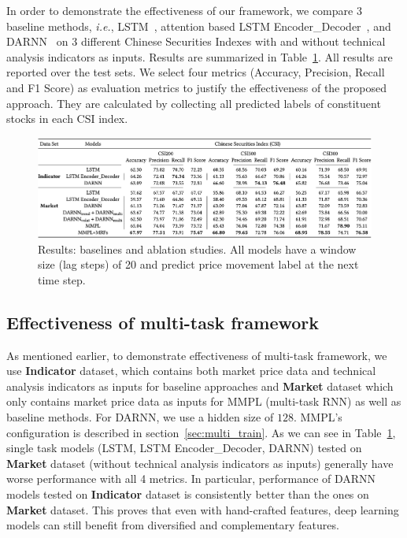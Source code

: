 In order to demonstrate the effectiveness of our framework, we
compare 3 baseline methods, \textit{i.e.},
LSTM~\cite{hochreiter1997long}, attention based LSTM
Encoder\_Decoder~\cite{attention}, and DARNN~\cite{qin2017dual}
on 3 different Chinese Securities Indexes with and without
technical analysis indicators as inputs. Results are summarized
in Table~\ref{tab:result}. All results are reported over the test
sets. We select four metrics (Accuracy, Precision, Recall and F1
Score) as evaluation metrics to justify the effectiveness of the
proposed approach. They are calculated by collecting all
predicted labels of constituent stocks in each CSI index.

\begin{figure}[t]
  \centering
  \includegraphics[width=1\columnwidth]{Part2/figures/table_results.png}
  \caption{\label{tab:result} Results: baselines and ablation
    studies. All models have a window size (lag steps) of 20 and
    predict price movement label at the next time step.}
\end{figure}


\subsection{Effectiveness of multi-task framework}

As mentioned earlier, to demonstrate effectiveness of multi-task
framework, we use \textbf{Indicator} dataset, which contains both
market price data and technical analysis indicators as inputs for
baseline approaches and \textbf{Market} dataset which only
contains market price data as inputs for MMPL (multi-task RNN) as
well as baseline methods. For DARNN, we use a hidden size of
$128$. MMPL's configuration is described in
section~\ref{sec:multi_train}. As we can see in
Table~\ref{tab:result}, single task models (LSTM, LSTM
Encoder\_Decoder, DARNN) tested on \textbf{Market} dataset
(without technical analysis indicators as inputs) generally have
worse performance with all 4 metrics. In particular, performance of
DARNN models tested on \textbf{Indicator} dataset is consistently
better than the ones on \textbf{Market} dataset. This proves that
even with hand-crafted features, deep learning models can still
benefit from diversified and complementary features.

